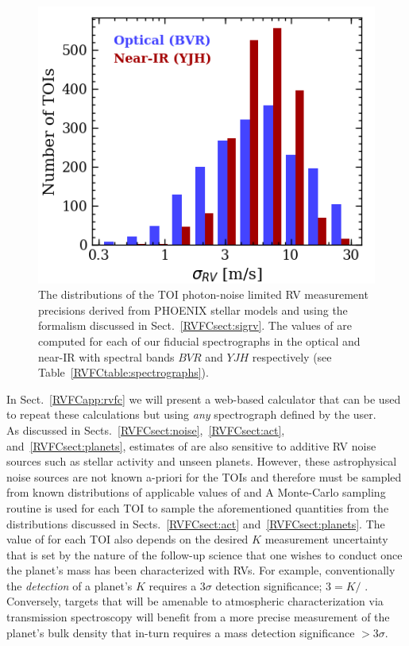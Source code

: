 \begin{figure}
  \centering
  \includegraphics[width=0.6\hsize]{figures/sigRVhist.png}
  \caption[Histograms of the expected photon-noise limited RV precision for TOIs.]
      {\small The distributions of the TOI photon-noise limited RV measurement precisions derived from
    PHOENIX stellar models and using the formalism discussed in Sect.~\ref{RVFCsect:sigrv}. The values of \sigRV{}
    are computed for each of our fiducial spectrographs in the optical and near-IR with spectral bands $BVR$
    and $YJH$ respectively (see Table~\ref{RVFCtable:spectrographs}).}
  \label{RVFCfig:sigRV}
\end{figure}

In Sect.~\ref{RVFCapp:rvfc}
we will present a web-based \nrv{(}\sigRV{)} calculator that can be used to repeat these calculations but
using \emph{any} spectrograph defined by the user. \\



As discussed in Sects.~\ref{RVFCsect:noise},~\ref{RVFCsect:act}, and~\ref{RVFCsect:planets}, estimates of
\nrv{} are also sensitive to additive RV noise sources such as stellar activity and unseen planets.
However, these astrophysical noise sources are not known a-priori for the 
TOIs and therefore must be sampled from known distributions of applicable values of \sigact{}
and  A Monte-Carlo sampling routine is used for each TOI to sample the aforementioned
quantities from the distributions discussed in Sects.~\ref{RVFCsect:act} and~\ref{RVFCsect:planets}.
The value of \nrv{} for each TOI also depends on the desired $K$ measurement uncertainty
that is set by the nature of the
follow-up science that one wishes to conduct once the planet's mass has been characterized with RVs.
For example, conventionally the \emph{detection} of a planet's $K$ requires a $3\sigma$ detection
significance; $3 = K/$ \sigK{}. Conversely, targets that will be amenable to atmospheric
characterization via transmission spectroscopy will benefit from a more precise measurement of the
planet's bulk density that in-turn requires a mass detection significance $>3\sigma$. \\


